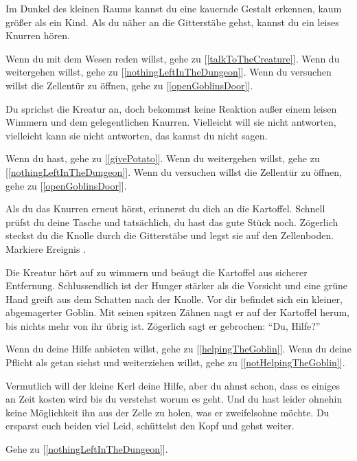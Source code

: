 Im Dunkel des kleinen Raums kannst du eine kauernde Gestalt erkennen, kaum größer als ein Kind.
Als du näher an die Gitterstäbe gehst, kannst du ein leises Knurren hören.

Wenn du mit dem Wesen reden willst, gehe zu [\ref{talkToTheCreature}].
Wenn du weitergehen willst, gehe zu [\ref{nothingLeftInTheDungeon}].
Wenn du versuchen willst die Zellentür zu öffnen, gehe zu [\ref{openGoblinsDoor}].


Du sprichst die Kreatur an, doch bekommst keine Reaktion außer einem leisen Wimmern und dem gelegentlichen Knurren. Vielleicht will sie nicht antworten, vielleicht kann sie nicht antworten, das kannst du nicht sagen.

Wenn du  hast, gehe zu [\ref{givePotato}].
Wenn du weitergehen willst, gehe zu [\ref{nothingLeftInTheDungeon}].
Wenn du versuchen willst die Zellentür zu öffnen, gehe zu [\ref{openGoblinsDoor}].


Als du das Knurren erneut hörst, erinnerst du dich an die Kartoffel. Schnell prüfst du deine Tasche und tatsächlich, du hast das gute Stück noch. Zögerlich steckst du die Knolle durch die Gitterstäbe und legst sie auf den Zellenboden. Markiere Ereignis .

Die Kreatur hört auf zu wimmern und beäugt die Kartoffel aus sicherer Entfernung. Schlussendlich ist der Hunger stärker als die Vorsicht und eine grüne Hand greift aus dem Schatten nach der Knolle. Vor dir befindet sich ein kleiner, abgemagerter Goblin. Mit seinen spitzen Zähnen nagt er auf der Kartoffel herum, bis nichts mehr von ihr übrig ist. Zögerlich sagt er gebrochen: ``Du, Hilfe?''

Wenn du deine Hilfe anbieten willst, gehe zu [\ref{helpingTheGoblin}].
Wenn du deine Pflicht als getan siehst und weiterziehen willst, gehe zu [\ref{notHelpingTheGoblin}].


Vermutlich will der kleine Kerl deine Hilfe, aber du ahnst schon, dass es einiges an Zeit kosten wird bis du verstehst worum es geht. Und du hast leider ohnehin keine Möglichkeit ihn aus der Zelle zu holen, was er zweifelsohne möchte. Du ersparst euch beiden viel Leid, schüttelst den Kopf und gehst weiter.

Gehe zu [\ref{nothingLeftInTheDungeon}].


